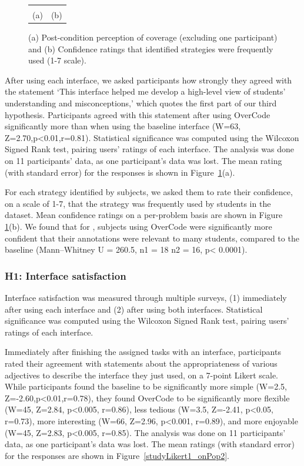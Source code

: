 \begin{figure}[t!]
\begin{tabular}{c | c}
\begin{minipage}{.5\linewidth}
\end{minipage}
\\
(a) & (b)
\end{tabular}
\caption{(a) Post-condition perception of coverage (excluding one participant) and (b) Confidence ratings that identified strategies were frequently used (1-7 scale).}
\label{perceivedCoverage}
\end{figure}

After using each interface, we asked participants how strongly they agreed with the statement `This interface helped me develop a high-level view of students' understanding and misconceptions,' which quotes the first part of our third hypothesis. Participants agreed with this statement after using OverCode significantly more than when using the baseline interface (W=63, Z=2.70,p<0.01,r=0.81). Statistical significance was computed using the Wilcoxon Signed Rank test, pairing users' ratings of each interface. The analysis was done on 11 participants' data, as one participant's data was lost. The mean rating (with standard error) for the responses is shown in Figure~\ref{perceivedCoverage}(a). 

For each strategy identified by subjects, we asked them to rate their confidence, on a scale of 1-7, that the strategy was frequently used by students in the dataset. Mean confidence ratings on a per-problem basis are shown in Figure \ref{perceivedCoverage}(b). We found that for , subjects using OverCode were significantly more confident that their annotations were relevant to many students, compared to the baseline (Mann--Whitney U = 260.5, n1 = 18 n2 = 16, p< 0.0001).
 
\subsubsection{H1: Interface satisfaction}

Interface satisfaction was measured through multiple surveys, (1) immediately after using each interface and (2) after using both interfaces. Statistical significance was computed using the Wilcoxon Signed Rank test, pairing users' ratings of each interface. 

Immediately after finishing the assigned tasks with an interface, participants rated their agreement with statements about the appropriateness of various adjectives to describe the interface they just used, on a 7-point Likert scale. While participants found the baseline to be significantly more simple (W=2.5, Z=-2.60,p<0.01,r=0.78), they found OverCode to be significantly more flexible (W=45, Z=2.84, p<0.005, r=0.86), less tedious (W=3.5, Z=-2.41, p<0.05, r=0.73), more interesting (W=66, Z=2.96, p<0.001, r=0.89), and more enjoyable (W=45, Z=2.83, p<0.005, r=0.85). The analysis was done on 11 participants' data, as one participant's data was lost. The mean ratings (with standard error) for the responses are shown in Figure~\ref{studyLikert1_onPop2}. 

